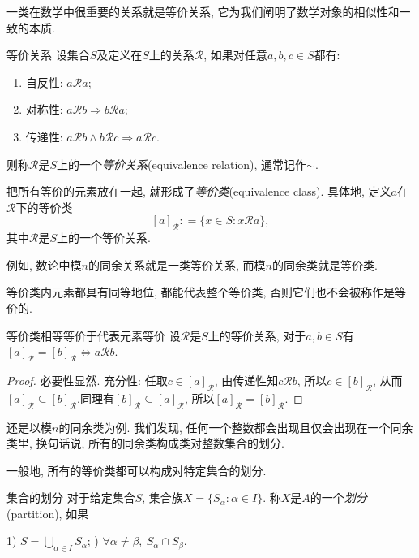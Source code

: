 一类在数学中很重要的关系就是等价关系, 它为我们阐明了数学对象的相似性和一致的本质. 

\begin{definition}{等价关系}
	设集合$S$及定义在$S$上的关系$\mathcal{R}$, 如果对任意$a, b, c \in S$都有: 
	\begin{enumerate}
		\item 自反性: $a\mathcal{R} a$; 
		\item 对称性: $a\mathcal{R} b \Rightarrow b\mathcal{R} a$; 
		\item 传递性: $a\mathcal{R} b \wedge b\mathcal{R} c \Rightarrow a\mathcal{R} c$.
	\end{enumerate}
	则称$\mathcal{R}$是$S$上的一个\textit{等价关系}(equivalence relation), 通常记作$\sim$.
\end{definition}

把所有等价的元素放在一起, 就形成了\textit{等价类}(equivalence class). 具体地, 定义$a$在$\mathcal{R}$下的等价类$$[a]_{\mathcal{R}} : = \{ x \in S: x\mathcal{R}a \}, $$其中$\mathcal{R}$是$S$上的一个等价关系.

例如, 数论中模$n$的同余关系就是一类等价关系, 而模$n$的同余类就是等价类.

等价类内元素都具有同等地位, 都能代表整个等价类, 否则它们也不会被称作是等价的.

\begin{proposition}{等价类相等等价于代表元素等价}
	设$\mathcal{R}$是$S$上的等价关系, 对于$a, b \in S$有$[a]_{\mathcal{R}} = [b]_{\mathcal{R}} \Leftrightarrow a\mathcal{R} b$. 
\end{proposition}
\begin{proof}
	必要性显然. 充分性: 任取$c \in [a]_{\mathcal{R}}$, 由传递性知$c \mathcal{R} b$, 所以$c \in [b]_{\mathcal{R}}$, 从而$[a]_{\mathcal{R}} \subseteq [b]_{\mathcal{R}}$.同理有$[b]_{\mathcal{R}} \subseteq [a]_{\mathcal{R}}$, 所以$[a]_{\mathcal{R}} = [b]_{\mathcal{R}}$.
\end{proof}

还是以模$n$的同余类为例. 我们发现, 任何一个整数都会出现且仅会出现在一个同余类里, 换句话说, 所有的同余类构成类对整数集合的划分. 

一般地, 所有的等价类都可以构成对特定集合的划分. 

\begin{definition}{集合的划分}
	对于给定集合$S$, 集合族$X=\{ S_{\alpha} :  \alpha \in I \}$. 称$X$是$A$的一个\textit{划分}(partition), 如果
	\begin{center}
		1) $S = \bigcup_{\alpha \in I} S_{\alpha}$; ) $\forall \alpha \neq \beta , ~S_{\alpha} \cap S_{\beta}$.
	\end{center}
\end{definition}

